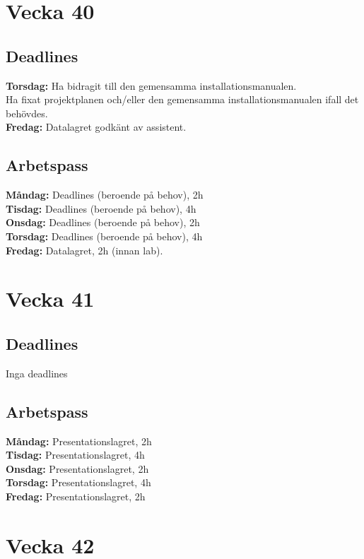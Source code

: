 \documentclass{TDP003mall}
\begin{document}
\section*{Vecka 40}
\subsection*{Deadlines}
\textbf{Torsdag: }Ha bidragit till den gemensamma installationsmanualen.\\
\-\hspace{47pt}Ha fixat projektplanen och/eller den gemensamma installationsmanualen ifall det behövdes.\\
\textbf{Fredag: }Datalagret godkänt av assistent.

\subsection*{Arbetspass}
\textbf{Måndag: }Deadlines (beroende på behov), 2h\\
\textbf{Tisdag: }Deadlines (beroende på behov), 4h\\
\textbf{Onsdag: }Deadlines (beroende på behov), 2h\\
\textbf{Torsdag: }Deadlines (beroende på behov), 4h\\
\textbf{Fredag: }Datalagret, 2h (innan lab).


\section*{Vecka 41}
\subsection*{Deadlines}
Inga deadlines
\subsection*{Arbetspass}
\textbf{Måndag: }Presentationslagret, 2h\\
\textbf{Tisdag: }Presentationslagret, 4h\\
\textbf{Onsdag: }Presentationslagret, 2h\\
\textbf{Torsdag: }Presentationslagret, 4h\\
\textbf{Fredag: }Presentationslagret, 2h\\


\section*{Vecka 42}
\end{document}
